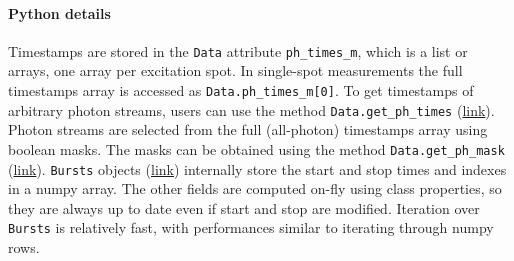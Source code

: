 \paragraph{Python details}
Timestamps are stored in the \verb|Data| attribute \verb|ph_times_m|, which is a list
or arrays, one array per excitation spot. In single-spot measurements the full
timestamps array is accessed as \verb|Data.ph_times_m[0]|. To get  timestamps
of arbitrary photon streams, users can use the method \verb|Data.get_ph_times|
(\href{http://fretbursts.readthedocs.org/en/latest/data_class.html?highlight=get_ph_times#fretbursts.burstlib.Data.get_ph_times}{link}).
Photon streams are selected from the full (all-photon) timestamps array using
boolean masks. The masks can be obtained using the method \verb|Data.get_ph_mask|
(\href{http://fretbursts.readthedocs.org/en/latest/data_class.html?highlight=get_ph_mask#fretbursts.burstlib.Data.get_ph_mask}{link}).
\verb|Bursts| objects 
(\href{http://fretbursts.readthedocs.org/en/latest/burstsearch.html}{link})
internally store the start and stop times and indexes in a numpy array.
The other fields are computed on-fly using class properties, so they are always
up to date even if start and stop are modified. Iteration over \verb|Bursts| is
relatively fast, with performances similar to iterating through numpy rows.

